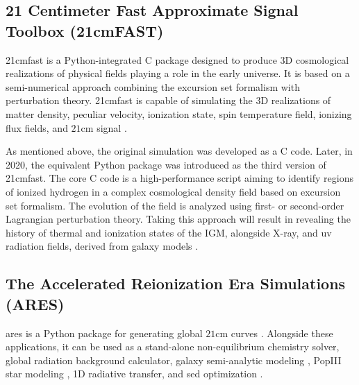 \documentclass[12pt, TexShade, letterpaper]{report}
\begin{document}
\subsection{21 Centimeter Fast Approximate Signal Toolbox (21cmFAST)}
\gls{21cmfast} is a Python-integrated C package designed to produce 3D cosmological realizations of physical fields playing a role in the early universe. It is based on a semi-numerical approach combining the excursion set formalism with perturbation theory. \gls{21cmfast} is capable of simulating the 3D realizations of matter density, peculiar velocity, ionization state, spin temperature field, ionizing flux fields, and $\mathrm{21cm}$ signal \cite{21cmfast_c, 21cmfast_python, 21cmfast_documentation, 21cmfast_github}.\par
As mentioned above, the original simulation was developed as a C code. Later, in 2020, the equivalent Python package was introduced as the third version of \gls{21cmfast}. The core C code is a high-performance script aiming to identify regions of ionized hydrogen in a complex cosmological density field based on excursion set formalism. The evolution of the field is analyzed using first- or second-order Lagrangian perturbation theory. Taking this approach will result in revealing the history of thermal and ionization states of the IGM, alongside X-ray, and \gls{uv} radiation fields, derived from galaxy models \cite{21cmfast_c}. \par

\subsection{The Accelerated Reionization Era Simulations (ARES)}
\gls{ares} is a Python package for generating global $\mathrm{21cm}$ curves \cite{ares2014jordan, ares_documentation, ares_github}. Alongside these applications, it can be used as a stand-alone non-equilibrium chemistry solver, global radiation background calculator,  galaxy semi-analytic modeling \cite{jordan_galaxy_1, jordan_galaxy_2, jordan_galaxy_3}, PopIII star modeling \cite{jordan_star}, 1D radiative transfer, and \gls{sed} optimization \cite{jordan_SED}.\par
\end{document}
